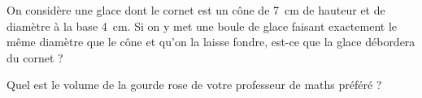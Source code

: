 
On considère une glace dont le cornet est un cône de 7~cm de hauteur et de diamètre à la base 4~cm. Si on y met une boule de glace faisant exactement le même diamètre que le cône et qu'on la laisse fondre, est-ce que la glace débordera du cornet ?


Quel est le volume de la gourde rose de votre professeur de maths préféré ?